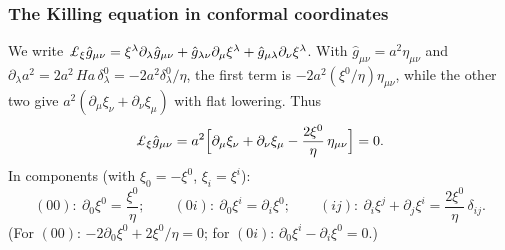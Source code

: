 \subsubsection{The Killing equation in conformal coordinates}
\tD{}
We write $\chsevLie_\xi\hat g_{\mu\nu}=\xi^\lambda\partial_\lambda\hat g_{\mu\nu}+\hat g_{\lambda\nu}\partial_\mu\xi^\lambda+\hat g_{\mu\lambda}\partial_\nu\xi^\lambda$.
With $\hat g_{\mu\nu}=a^2\eta_{\mu\nu}$ and $\partial_\lambda a^2=2a^2\,Ha\,\delta^0_\lambda=-2a^2\delta^0_\lambda/\eta$,
the first term is $-2a^2(\xi^0/\eta)\eta_{\mu\nu}$, while the other two give $a^2(\partial_\mu\xi_\nu+\partial_\nu\xi_\mu)$ with flat lowering. Thus
\begin{equation}
\chsevLie_\xi\hat g_{\mu\nu}=a^2\Big[\partial_\mu\xi_\nu+\partial_\nu\xi_\mu-\frac{2\xi^0}{\eta}\,\eta_{\mu\nu}\Big]=0 .
\label{eq:ch7-killing}
\end{equation}
In components (with $\xi_0=-\xi^0$, $\xi_i=\xi^i$):
\begin{equation}
(00):\ \partial_0\xi^0=\frac{\xi^0}{\eta};\qquad
(0i):\ \partial_0\xi^i=\partial_i\xi^0;\qquad
(ij):\ \partial_i\xi^j+\partial_j\xi^i=\frac{2\xi^0}{\eta}\,\delta_{ij}.
\label{eq:ch7-killing-comp}
\end{equation}
(For $(00)$: $-2\partial_0\xi^0+2\xi^0/\eta=0$; for $(0i)$: $\partial_0\xi^i-\partial_i\xi^0=0$.)

